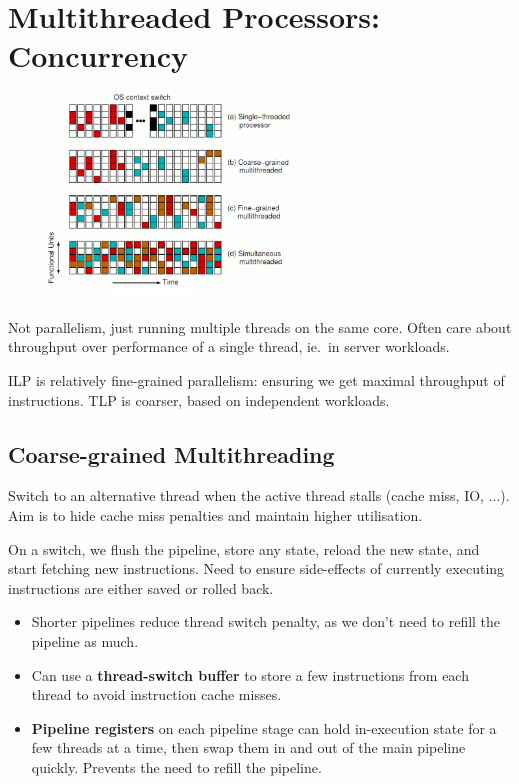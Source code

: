 \documentclass[a4paper,11pt]{article}
\begin{document}
\section*{Multithreaded Processors: \textbf{Concurrency}}
{
    \begin{figure}
    \centering
    \includegraphics[width=0.57\textwidth]{multithreading-summary.png}
    \end{figure}
    
    Not parallelism, just running multiple threads on the same core. Often care about throughput over performance of a single thread, ie.\ in server workloads.

    ILP is relatively fine-grained parallelism: ensuring we get maximal throughput of instructions. TLP is coarser, based on independent workloads.

    \subsection*{Coarse-grained Multithreading}
    {
        Switch to an alternative thread when the active thread stalls (cache miss, IO, ...). Aim is to hide cache miss penalties and maintain higher utilisation.

        On a switch, we flush the pipeline, store any state, reload the new state, and start fetching new instructions. Need to ensure side-effects of currently executing instructions are either saved or rolled back.

        \begin{itemize}
        \item Shorter pipelines reduce thread switch penalty, as we don't need to refill the pipeline as much.
        \item Can use a \textbf{thread-switch buffer} to store a few instructions from each thread to avoid instruction cache misses. 
        \item \textbf{Pipeline registers} on each pipeline stage can hold in-execution state for a few threads at a time, then swap them in and out of the main pipeline quickly. Prevents the need to refill the pipeline.
        \end{itemize}
    }
}
\end{document}
